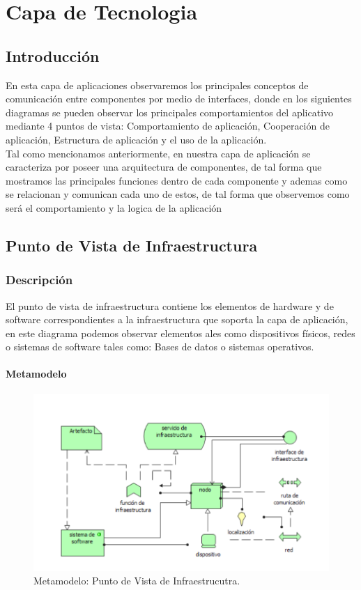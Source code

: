 \chapter{Capa de Tecnologia}

\section{Introducción}
En esta capa de aplicaciones observaremos los principales conceptos de comunicación entre componentes por medio de interfaces, donde en los siguientes diagramas se pueden observar los principales comportamientos del aplicativo mediante 4 puntos de vista: Comportamiento de aplicación, Cooperación de aplicación, Estructura de aplicación y el uso de la aplicación.\\
Tal como mencionamos anteriormente, en nuestra capa de aplicación se caracteriza por poseer una arquitectura de componentes, de tal forma que  mostramos las principales funciones dentro de cada componente y ademas como se relacionan y comunican cada uno de estos, de tal forma que observemos como será el comportamiento y la logica de la aplicación

\section{Punto de Vista de Infraestructura}
\subsection{Descripción}
El punto de vista de infraestructura contiene los elementos de hardware y de software correspondientes a la infraestructura que soporta la capa de aplicación, en este diagrama podemos observar elementos ales como dispositivos físicos, redes o sistemas de software tales como: Bases de datos o sistemas operativos.

\subsubsection{Metamodelo}
\begin{figure}[h]
	\centering
	\includegraphics[width=1.0\textwidth]{imagenes/Metamodelos/Tecnologia/meta_infraestructura.PDF}
	\caption{Metamodelo: Punto de Vista de Infraestrucutra.}
	\label{fig:gap_analysis}
\end{figure}

